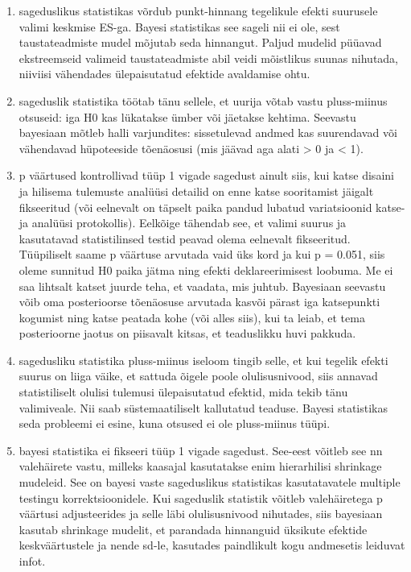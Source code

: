 \documentclass[]{book}
\begin{document}
\begin{enumerate}
\def\labelenumi{\arabic{enumi}.}
\item
  sageduslikus statistikas võrdub punkt-hinnang tegelikule efekti
  suurusele valimi keskmise ES-ga. Bayesi statistikas see sageli nii ei
  ole, sest taustateadmiste mudel mõjutab seda hinnangut. Paljud mudelid
  püüavad ekstreemseid valimeid taustateadmiste abil veidi mõistlikus
  suunas nihutada, niiviisi vähendades ülepaisutatud efektide avaldamise
  ohtu.
\item
  sageduslik statistika töötab tänu sellele, et uurija võtab vastu
  pluss-miinus otsuseid: iga H0 kas lükatakse ümber või jäetakse
  kehtima. Seevastu bayesiaan mõtleb halli varjundites: sissetulevad
  andmed kas suurendavad või vähendavad hüpoteeside tõenäosusi (mis
  jäävad aga alati \textgreater{} 0 ja \textless{} 1).
\item
  p väärtused kontrollivad tüüp 1 vigade sagedust ainult siis, kui katse
  disaini ja hilisema tulemuste analüüsi detailid on enne katse
  sooritamist jäigalt fikseeritud (või eelnevalt on täpselt paika pandud
  lubatud variatsioonid katse- ja analüüsi protokollis). Eelkõige
  tähendab see, et valimi suurus ja kasutatavad statistilinsed testid
  peavad olema eelnevalt fikseeritud. Tüüpiliselt saame p väärtuse
  arvutada vaid üks kord ja kui p = 0.051, siis oleme sunnitud H0 paika
  jätma ning efekti deklareerimisest loobuma. Me ei saa lihtsalt katset
  juurde teha, et vaadata, mis juhtub. Bayesiaan seevastu võib oma
  posterioorse tõenäosuse arvutada kasvõi pärast iga katsepunkti
  kogumist ning katse peatada kohe (või alles siis), kui ta leiab, et
  tema posterioorne jaotus on piisavalt kitsas, et teaduslikku huvi
  pakkuda.
\item
  sagedusliku statistika pluss-miinus iseloom tingib selle, et kui
  tegelik efekti suurus on liiga väike, et sattuda õigele poole
  olulisusnivood, siis annavad statistiliselt olulisi tulemusi
  ülepaisutatud efektid, mida tekib tänu valimiveale. Nii saab
  süstemaatiliselt kallutatud teaduse. Bayesi statistikas seda probleemi
  ei esine, kuna otsused ei ole pluss-miinus tüüpi.
\item
  bayesi statistika ei fikseeri tüüp 1 vigade sagedust. See-eest võitleb
  see nn valehäirete vastu, milleks kaasajal kasutatakse enim
  hierarhilisi shrinkage mudeleid. See on bayesi vaste sageduslikus
  statistikas kasutatavatele multiple testingu korrektsioonidele. Kui
  sageduslik statistik võitleb valehäiretega p väärtusi adjusteerides ja
  selle läbi olulisusnivood nihutades, siis bayesiaan kasutab shrinkage
  mudelit, et parandada hinnanguid üksikute efektide keskväärtustele ja
  nende sd-le, kasutades paindlikult kogu andmesetis leiduvat infot.
\end{enumerate}
\end{document}
